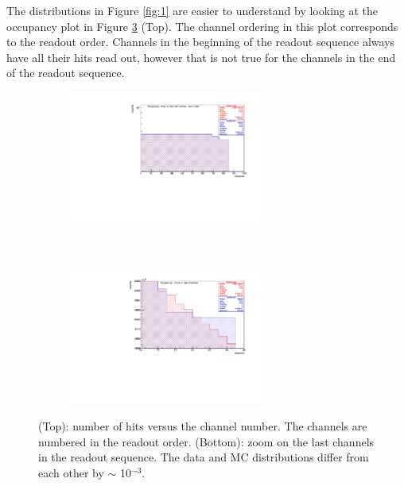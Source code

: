 The distributions in Figure \ref{fig:1} are easier to understand by looking at the occupancy plot in Figure \ref{fig:2} (Top).
The channel ordering in this plot corresponds to the readout order.
Channels in the beginning of the readout sequence always have all their hits read out,
  however that is not true for the channels in the end of the readout sequence.
  \begin{figure}[!h]
    \begin{subfigure}[b]{\textwidth}
        \centering
        \includegraphics[width=0.7\textwidth]{figures/pdf/figure_00004_nhitsvschannel_roc_simulation_281.pdf}
        \label{fig:tt1}
    \end{subfigure}
  \\
    \begin{subfigure}[b]{\textwidth}
        \centering
        \includegraphics[width=0.7\textwidth]{figures/pdf/figure_00014_nhitsvschannel_roc_simulation_281.pdf}
        \label{fig:tt2}
    \end{subfigure}
       \caption{(Top): number of hits versus the channel number. The channels are numbered in the readout order.
       (Bottom): zoom on the last channels in the readout sequence. The data and MC distributions
       differ from each other by $\sim$ 10$^{-3}$.}
       \label{fig:2}
  \end{figure}


